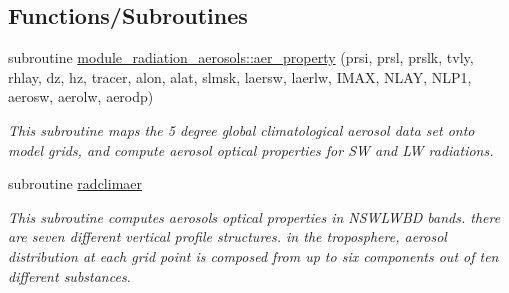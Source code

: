 \subsection*{Functions/\+Subroutines}
\textbf{ }\par
\begin{DoxyCompactItemize}
\item 
subroutine \hyperlink{group__module__radiation__aerosols_ga494892c147b1e14ffb241e413bc17a8b}{module\+\_\+radiation\+\_\+aerosols\+::aer\+\_\+property} (prsi, prsl, prslk, tvly, rhlay, dz, hz, tracer, alon, alat, slmsk, laersw, laerlw, I\+M\+AX, N\+L\+AY, N\+L\+P1, aerosw, aerolw, aerodp)
\begin{DoxyCompactList}\small\item\em This subroutine maps the 5 degree global climatological aerosol data set onto model grids, and compute aerosol optical properties for SW and LW radiations. \end{DoxyCompactList}\item 
subroutine \hyperlink{group__module__radiation__aerosols_gae60b55ebc37825b2c3c95f95b23ed558}{radclimaer}
\begin{DoxyCompactList}\small\item\em This subroutine computes aerosols optical properties in N\+S\+W\+L\+W\+BD bands. there are seven different vertical profile structures. in the troposphere, aerosol distribution at each grid point is composed from up to six components out of ten different substances. \end{DoxyCompactList}\end{DoxyCompactItemize}

